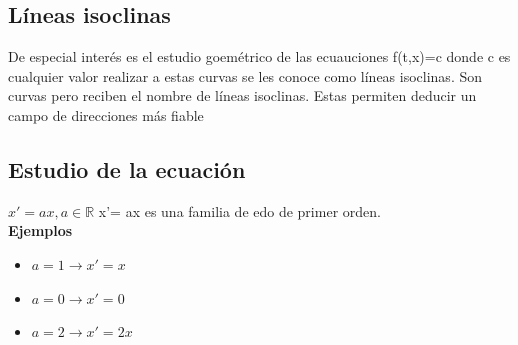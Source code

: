 \documentclass{book}
\begin{document}
     \subsection{Líneas isoclinas}
    De especial interés es el estudio goemétrico de las ecuauciones f(t,x)=c donde c es cualquier valor realizar
     a estas curvas se les conoce como líneas isoclinas. Son curvas pero reciben el nombre de líneas isoclinas.
    Estas permiten deducir un campo de direcciones más fiable
    \subsection{Estudio de la ecuación}
    \textbf{$x'=ax, a \in \mathbb{R}$} x'= ax es una familia de edo de primer orden.
    \\ 
     \textbf{Ejemplos}
     \begin{itemize}
         \item $a = 1\to x'=x$
         \item $a = 0\to x'=0$
         \item $a = 2\to x'=2x$
     \end{itemize}
\end{document}
